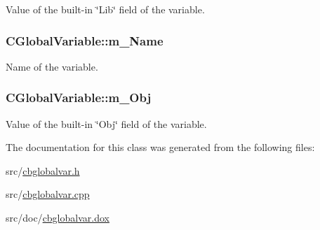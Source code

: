 Value of the built-\/in \char`\"{}\-Lib\char`\"{} field of the variable. 

\hypertarget{classCGlobalVariable_ae2e71db4b7f7a5c0dec2c97cf6186fc9}{
\subsubsection[{m\-\_\-\-Name}]{\setlength{\rightskip}{0pt plus 5cm}C\-Global\-Variable\-::m\-\_\-\-Name\hspace{0.3cm}{\ttfamily [private]}}}\label{classCGlobalVariable_ae2e71db4b7f7a5c0dec2c97cf6186fc9}


Name of the variable. 

\hypertarget{classCGlobalVariable_ac9845f5df77a0ec9e99d139b298ff7b5}{
\subsubsection[{m\-\_\-\-Obj}]{\setlength{\rightskip}{0pt plus 5cm}C\-Global\-Variable\-::m\-\_\-\-Obj\hspace{0.3cm}{\ttfamily [private]}}}\label{classCGlobalVariable_ac9845f5df77a0ec9e99d139b298ff7b5}


Value of the built-\/in \char`\"{}\-Obj\char`\"{} field of the variable. 



The documentation for this class was generated from the following files\-:\begin{DoxyCompactItemize}
\item 
src/\hyperlink{cbglobalvar_8h}{cbglobalvar.\-h}\item 
src/\hyperlink{cbglobalvar_8cpp}{cbglobalvar.\-cpp}\item 
src/doc/\hyperlink{cbglobalvar_8dox}{cbglobalvar.\-dox}\end{DoxyCompactItemize}
